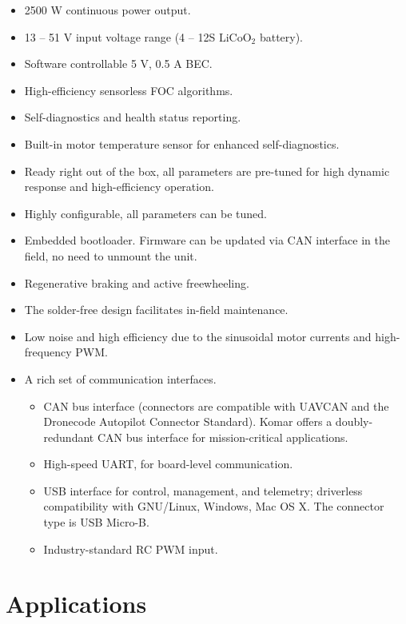 \documentclass{../document_templates/documentation_template_latex/zubaxdoc}
\begin{document}
\begin{titlepage}
\begin{itemize}
    \item 2500 W continuous power output.
    \item 13 -- 51 V input voltage range (4 -- 12S $\text{LiCoO}_\text{2}$ battery).
    \item Software controllable 5 V, 0.5 A BEC.
    \item High-efficiency sensorless FOC algorithms.
    \item Self-diagnostics and health status reporting.
    \item Built-in motor temperature sensor for enhanced self-diagnostics.
    \item Ready right out of the box, all parameters are pre-tuned for high dynamic response and high-efficiency operation.
    \item Highly configurable, all parameters can be tuned.
    \item Embedded bootloader. Firmware can be updated via CAN interface in the field, no need to unmount the unit.
    \item Regenerative braking and active freewheeling.
    \item The solder-free design facilitates in-field maintenance.
    \item Low noise and high efficiency due to the sinusoidal \mbox{motor} currents and high-frequency PWM.
    \item A rich set of communication interfaces.
     \begin{itemize}
        \item CAN bus interface (connectors are compatible with UAVCAN and the Dronecode Autopilot Connector Standard).
         Komar offers a doubly-redundant CAN bus interface for mission-critical applications.
        \item High-speed UART, for board-level communication.
        \item USB interface for control, management, and telemetry; driverless compatibility with GNU/Linux, Windows,
        Mac OS X. The connector type is USB Micro-B.
        \item Industry-standard RC PWM input.
    \end{itemize}
\end{itemize}

\section*{Applications}


\end{titlepage}
\end{document}
